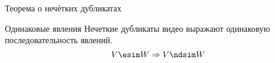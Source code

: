 \begin{frame}{Теорема о нечётких дубликатах}

   \begin{orange-box}{Одинаковые явления}
        Нечеткие дубликаты видео выражают 
        одинаковую последовательность явлений.
        \[
             V \esim  W \Rightarrow  V \ndsim  W
        \]
    \end{orange-box}

\end{frame}








